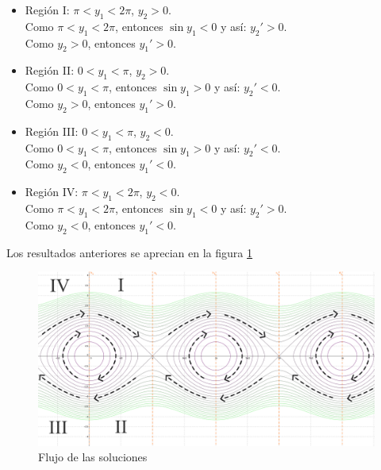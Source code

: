 \documentclass[10pt,letterpaper,titlepage]{article}
\begin{document}
\begin{itemize}
	\item Regi\'on I: $\pi<y_{1}< 2\pi$, $y_{2}>0$.\\
		Como $\pi<y_{1}< 2\pi$, entonces $\sin y_{1} < 0$ y as\'i: $y_{2}' >0$.\\
		Como $y_{2}>0$, entonces $y_{1}'>0$.
	\item Regi\'on II: $0<y_{1}< \pi$, $y_{2}>0$.\\
		Como $0<y_{1}< \pi$, entonces $\sin y_{1} > 0$ y as\'i: $y_{2}' <0$.\\
		Como $y_{2}>0$, entonces $y_{1}'>0$.
	\item Regi\'on III: $0<y_{1}< \pi$, $y_{2}<0$.\\
		Como $0<y_{1}< \pi$, entonces $\sin y_{1} > 0$ y as\'i: $y_{2}' <0$.\\
		Como $y_{2}<0$, entonces $y_{1}'<0$.
	\item Regi\'on IV: $\pi<y_{1}< 2\pi$, $y_{2}<0$.\\
		Como $\pi<y_{1}< 2\pi$, entonces $\sin y_{1} < 0$ y as\'i: $y_{2}' >0$.\\
		Como $y_{2}<0$, entonces $y_{1}'<0$.
\end{itemize}

Los resultados anteriores se aprecian en la figura \ref{fig:flujo}

\begin{figure}
	\includegraphics[width=\textwidth]{flujo.png}
	\caption{Flujo de las soluciones}
	\label{fig:flujo}
\end{figure}
\end{document}
